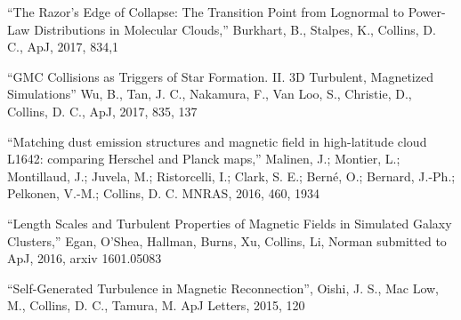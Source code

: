 \medskip
\noindent
``The Razor’s Edge of Collapse: The Transition Point from Lognormal to Power-Law Distributions in Molecular Clouds,'' 
Burkhart, B., Stalpes, K., Collins, D. C.,
ApJ, 2017, 834,1

\medskip
\noindent
``GMC Collisions as Triggers of Star Formation. II. 3D Turbulent, Magnetized Simulations'' 
Wu, B., Tan, J. C., Nakamura, F., Van Loo, S., Christie, D., Collins, D. C., 
ApJ, 2017, 835, 137

\medskip
\noindent
``Matching dust emission structures and magnetic field in high-latitude cloud L1642: comparing Herschel and Planck maps,''
Malinen, J.; Montier, L.; Montillaud, J.; Juvela, M.; Ristorcelli, I.; Clark, S.  E.; Bern\'e, O.; Bernard, J.-Ph.; Pelkonen, V.-M.; Collins, D. C. 
MNRAS, 2016, 460, 1934


\medskip
\noindent
``Length Scales and Turbulent Properties of Magnetic Fields in Simulated Galaxy Clusters,'' 
Egan, O’Shea, Hallman, Burns, Xu, Collins, Li, Norman  
submitted to ApJ, 2016, arxiv 1601.05083

\medskip
\noindent
``Self-Generated Turbulence in Magnetic Reconnection'', 
Oishi, J. S., Mac Low, M., Collins, D. C., Tamura, M.  
ApJ Letters, 2015, 120

